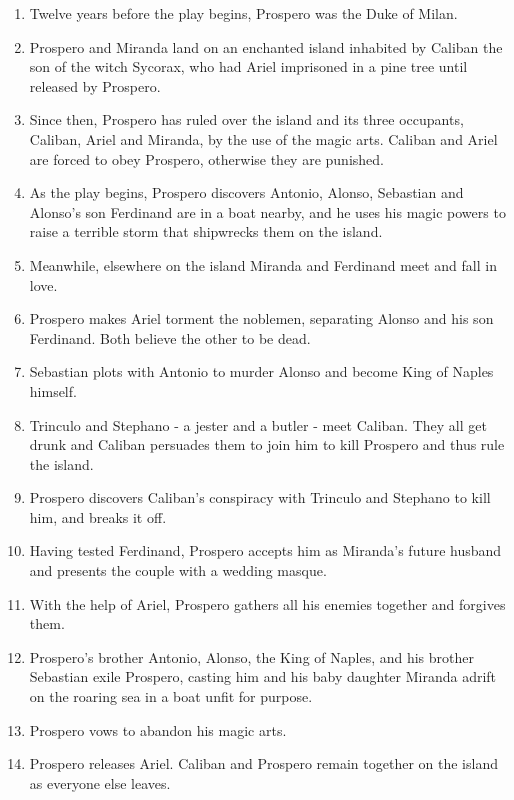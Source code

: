		\begin{enumerate}
			\item Twelve years before the play begins, Prospero was the Duke of Milan.

			\item Prospero and Miranda land on an enchanted island inhabited by Caliban the son of the witch Sycorax, who had Ariel imprisoned in a pine tree until released by Prospero.

			\item Since then, Prospero has ruled over the island and its three occupants, Caliban, Ariel and Miranda, by the use of the magic arts. Caliban and Ariel are forced to obey Prospero, otherwise they are punished.

			\item As the play begins, Prospero discovers Antonio, Alonso, Sebastian and Alonso's son Ferdinand are in a boat nearby, and he uses his magic powers to raise a terrible storm that shipwrecks them on the island.

			\item Meanwhile, elsewhere on the island Miranda and Ferdinand meet and fall in love.

			\item Prospero makes Ariel torment the noblemen, separating Alonso and his son Ferdinand. Both believe the other to be dead.
			
			\item Sebastian plots with Antonio to murder Alonso and become King of Naples himself.
			
			\item Trinculo and Stephano - a jester and a butler - meet Caliban. They all get drunk and Caliban persuades them to join him to kill Prospero and thus rule the island.
			
			\item Prospero discovers Caliban's conspiracy with Trinculo and Stephano to kill him, and breaks it off.
			
			\item Having tested Ferdinand, Prospero accepts him as Miranda's future husband and presents the couple with a wedding masque.

			\item With the help of Ariel, Prospero gathers all his enemies together and forgives them.

			\item Prospero's brother Antonio, Alonso, the King of Naples, and his brother Sebastian exile Prospero, casting him and his baby daughter Miranda adrift on the roaring sea in a boat unfit for purpose.

			\item Prospero vows to abandon his magic arts.

			\item Prospero releases Ariel. Caliban and Prospero remain together on the island as everyone else leaves.
		\end{enumerate}


